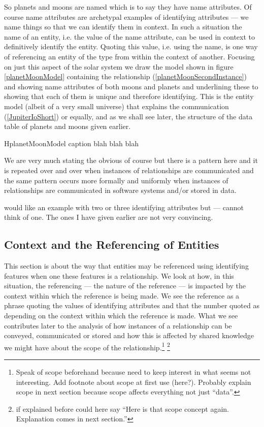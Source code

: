 \mynote So planets and moons are named which is to say they have name attributes.
Of course name attributes are archetypal examples of identifying attributes --- we name things so that we can identify them in context. In such a situation the name of an entity, i.e. the value of the name attribute,  can be used in context to definitively identify the entity.
Quoting this value, i.e. using the name, is one way of referencing an entity of the type from within the context of another.
 \mynote
Focusing on just this aspect of the solar system we  draw the model shown in figure
\ref{planetMoonModel}
containing the relationship (\ref{planetMoonSecondInstance}) and showing name attributes of both moons and planets and
underlining these to showing that each of them is unique and therefore identifying. 
This is the entity model (albeit of a very small universe) that explains the communication (\ref{JupiterIoShort}) or equally, and as we shall see later, the structure of the data table of planets and moons given earlier.
\begin{erboxedFigure} {H}{planetMoonModel}
{
caption blah blah blah
 }

\end{erboxedFigure}
\mynote
We are very much stating the obvious of course but there is a pattern here and it is repeated over and over when instances of relationships are communicated  and the same pattern occurs more formally  and uniformly when instances of relationships are communicated in software systems and/or stored in data.

\begin{noteforfuture}
would like an example with two or three identifying attributes but --- cannot think of one. The ones I have given earlier are not very convincing.
\end{noteforfuture}

\subsection{Context and the Referencing of Entities}
\mynote
This section is about the way that entities may be referenced using identifying features
 when one these features is a relationship.
We look at how,  in this situation, the referencing 
--- the nature of the reference ---   
is impacted by the context within which the reference is being made. 
We see the reference as a phrase quoting the values of identifying attributes
and that the number quoted as depending on 
the context within which the reference is made.
What we see contributes later to the analysis of how 
instances of a relationship can be conveyed, communicated or stored and
how this is affected by shared knowledge we might have about 
the scope of  the relationship.\footnote{Speak of scope beforehand because need to keep interest in what seems not interesting. Add footnote about scope at first use (here?). Probably explain scope in next section because scope affects everything not just ``data''.} \footnote{if explained before could here say ``Here is that scope concept again. Explanation comes in next section.''}

